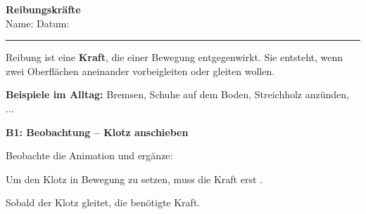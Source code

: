 \documentclass[11pt,a4paper]{article}
\newcommand{\aufgabe}[1]{\noindent\textbf{\textcolor{fachfarbe}{#1}}}
\newcommand{\luecke}[1]{\underline{\hspace{#1}}}
\begin{document}
\begin{minipage}[t]{0.80\textwidth}
    \vspace{0pt}
    {\Large\bfseries Reibungskräfte}\\[0.2em]
    {\small Name: \luecke{4.5cm} \hfill Datum: \luecke{2.5cm}}
\end{minipage}
\hfill
\begin{minipage}[t]{0.15\textwidth}
    \vspace{0pt}
    \raggedleft
\end{minipage}
\vspace{0.1em}
\hrule
\vspace{0.4em}

\begin{merkkasten}[title=K1: Was ist Reibung?]
\small
Reibung ist eine \textbf{Kraft}, die einer Bewegung entgegenwirkt. Sie entsteht, wenn zwei Oberflächen aneinander vorbeigleiten oder gleiten wollen.

\vspace{0.3em}
\textbf{Beispiele im Alltag:} Bremsen, Schuhe auf dem Boden, Streichholz anzünden, ...
\end{merkkasten}

\vspace{0.3em}

\aufgabe{B1: Beobachtung -- Klotz anschieben}

\vspace{0.2em}
Beobachte die Animation und ergänze:

\vspace{0.2em}
Um den Klotz in Bewegung zu setzen, muss die Kraft erst \luecke{4cm}.

Sobald der Klotz gleitet, \luecke{3cm} die benötigte Kraft.

\vspace{0.4em}
\end{document}
